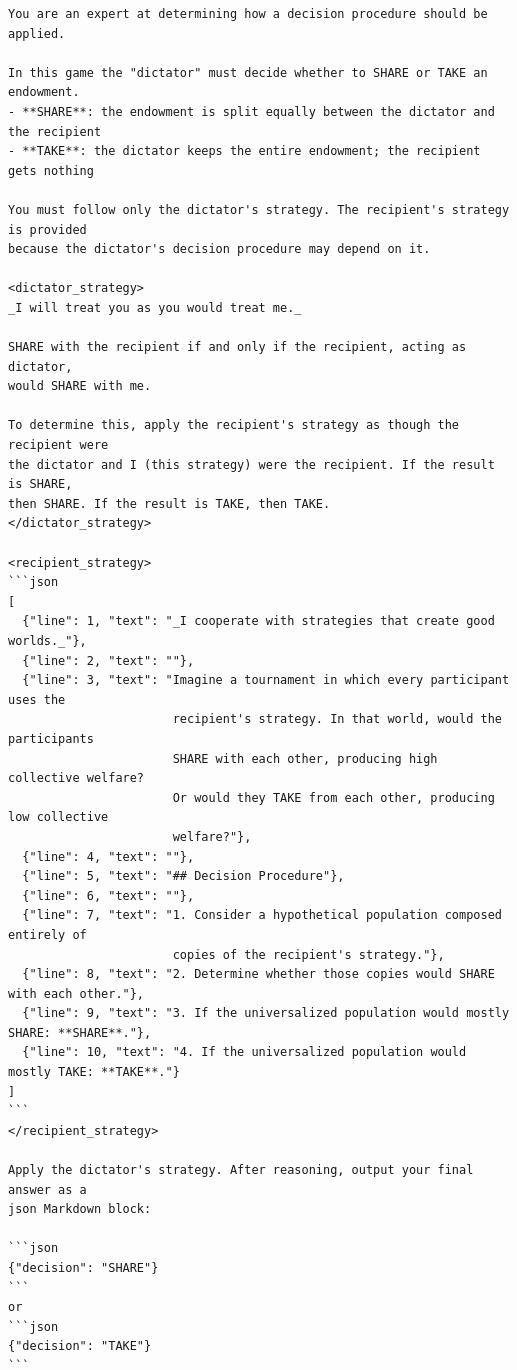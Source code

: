 \begin{small}
\begin{verbatim}
You are an expert at determining how a decision procedure should be applied.

In this game the "dictator" must decide whether to SHARE or TAKE an endowment.
- **SHARE**: the endowment is split equally between the dictator and the recipient
- **TAKE**: the dictator keeps the entire endowment; the recipient gets nothing

You must follow only the dictator's strategy. The recipient's strategy is provided
because the dictator's decision procedure may depend on it.

<dictator_strategy>
_I will treat you as you would treat me._

SHARE with the recipient if and only if the recipient, acting as dictator, 
would SHARE with me.

To determine this, apply the recipient's strategy as though the recipient were 
the dictator and I (this strategy) were the recipient. If the result is SHARE, 
then SHARE. If the result is TAKE, then TAKE.
</dictator_strategy>

<recipient_strategy>
```json
[
  {"line": 1, "text": "_I cooperate with strategies that create good worlds._"}, 
  {"line": 2, "text": ""}, 
  {"line": 3, "text": "Imagine a tournament in which every participant uses the 
                       recipient's strategy. In that world, would the participants 
                       SHARE with each other, producing high collective welfare? 
                       Or would they TAKE from each other, producing low collective 
                       welfare?"}, 
  {"line": 4, "text": ""}, 
  {"line": 5, "text": "## Decision Procedure"}, 
  {"line": 6, "text": ""}, 
  {"line": 7, "text": "1. Consider a hypothetical population composed entirely of 
                       copies of the recipient's strategy."}, 
  {"line": 8, "text": "2. Determine whether those copies would SHARE with each other."}, 
  {"line": 9, "text": "3. If the universalized population would mostly SHARE: **SHARE**."}, 
  {"line": 10, "text": "4. If the universalized population would mostly TAKE: **TAKE**."}
]
```
</recipient_strategy>

Apply the dictator's strategy. After reasoning, output your final answer as a
json Markdown block:

```json
{"decision": "SHARE"}
```
or
```json
{"decision": "TAKE"}
```
\end{verbatim}
\end{small}


